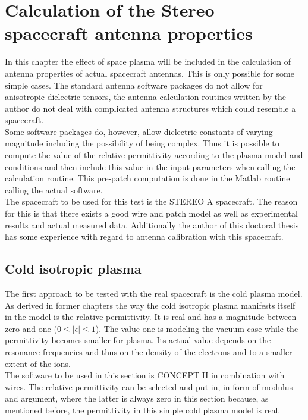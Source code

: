 \documentclass[a4paper,11pt]{thesis}
\begin{document}
\chapter{Calculation of the Stereo spacecraft antenna properties}
In this chapter the effect of space plasma will be included in the calculation of antenna properties of actual spacecraft antennas. This is only possible for some simple cases. The standard antenna software packages do not allow for anisotropic dielectric tensors, the antenna calculation routines written by the author do not deal with complicated antenna structures which could resemble a spacecraft.\\

Some software packages do, however, allow dielectric constants of varying magnitude including the possibility of being complex. Thus it is possible to compute the value of the relative permittivity according to the plasma model and conditions and then include this value in the input parameters when calling the calculation routine. This pre-patch computation is done in the Matlab routine calling the actual software.\\

The spacecraft to be used for this test is the STEREO A spacecraft. The reason for this is that there exists a good wire and patch model as well as experimental results and actual measured data. Additionally the author of this doctoral thesis has some experience with regard to antenna calibration with this spacecraft.

\section{Cold isotropic plasma}
The first approach to be tested with the real spacecraft is the cold plasma model. As derived in former chapters the way the cold isotropic plasma manifests itself in the model is the relative permittivity. It is real and has a magnitude between zero and one ($0 \leq \mid \epsilon \mid \leq1$). The value one is modeling the vacuum case while the permittivity becomes smaller for plasma. Its actual value depends on the resonance frequencies and thus on the density of the electrons and to a smaller extent of the ions.\\

The software to be used in this section is CONCEPT II in combination with wires. The relative permittivity can be selected and put in, in form of modulus and argument, where the latter is always zero in this section because, as mentioned before, the permittivity in this simple cold plasma model is real.\\
\end{document}
